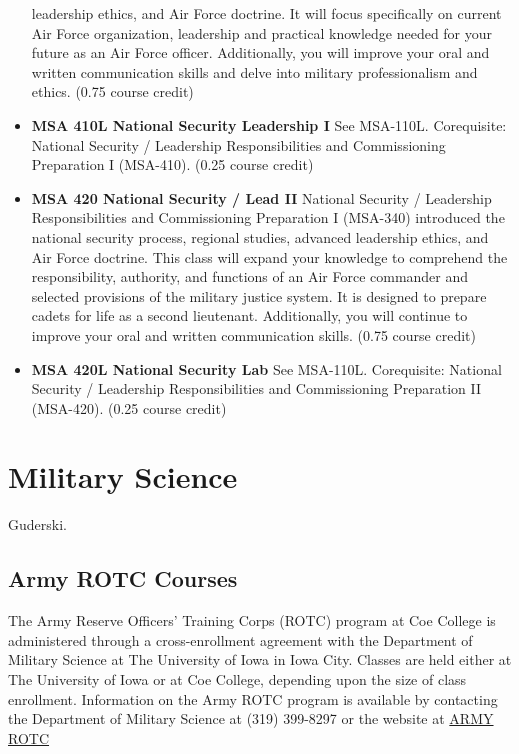 \documentclass[
  letterpaper,
]{scrbook}
\begin{document}
\begin{itemize}
  leadership ethics, and Air Force doctrine. It will focus specifically
  on current Air Force organization, leadership and practical knowledge
  needed for your future as an Air Force officer. Additionally, you will
  improve your oral and written communication skills and delve into
  military professionalism and ethics. (0.75 course credit)
\item
  \textbf{MSA 410L National Security Leadership I} See MSA-110L.
  Corequisite: National Security / Leadership Responsibilities and
  Commissioning Preparation I (MSA-410). (0.25 course credit)
\item
  \textbf{MSA 420 National Security / Lead II} National Security /
  Leadership Responsibilities and Commissioning Preparation I (MSA-340)
  introduced the national security process, regional studies, advanced
  leadership ethics, and Air Force doctrine. This class will expand your
  knowledge to comprehend the responsibility, authority, and functions
  of an Air Force commander and selected provisions of the military
  justice system. It is designed to prepare cadets for life as a second
  lieutenant. Additionally, you will continue to improve your oral and
  written communication skills. (0.75 course credit)
\item
  \textbf{MSA 420L National Security Lab} See MSA-110L. Corequisite:
  National Security / Leadership Responsibilities and Commissioning
  Preparation II (MSA-420). (0.25 course credit)
\end{itemize}

\section{Military Science}\label{military-science}

Guderski.

\subsection{Army ROTC Courses}\label{army-rotc-courses}

The Army Reserve Officers' Training Corps (ROTC) program at Coe College
is administered through a cross-enrollment agreement with the Department
of Military Science at The University of Iowa in Iowa City. Classes are
held either at The University of Iowa or at Coe College, depending upon
the size of class enrollment. Information on the Army ROTC program is
available by contacting the Department of Military Science at (319)
399-8297 or the website at
\href{http://armyrotc.com/edu/univia/index.htm}{ARMY ROTC}
\end{document}
